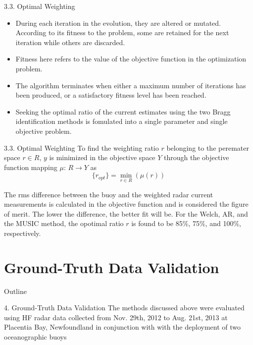 \documentclass[12pt]{beamer}
\begin{document}
\begin{frame}{3.3. Optimal Weighting}
  \begin{itemize}
    \item   During each iteration in the evolution, they are altered or mutated. According to its fitness to the problem, some are retained for the next iteration while others are discarded.
    \item Fitness here refers to the value of the objective function in the optimization problem.
    \item The algorithm terminates when either a maximum number of iterations has been produced, or a satisfactory fitness level has been reached. 
    \item Seeking the optimal ratio of the current estimates using the two Bragg identification methods is fomulated into a single parameter and single objective problem. 
  \end{itemize}
\end{frame}
\begin{frame}{3.3. Optimal Weighting}
   To find the weighting ratio $r$ belonging to the peremater space $r\in R$, $y$ is minimized in the objective space $Y$ through the objective function mapping $\mu$: $R\rightarrow Y$ as
   \begin{equation}
     \{r_{opt}\}=\min_{r\in R}(\mu(r))
   \end{equation}
   
   The rms difference between the buoy and the weighted radar current measurements is calculated in the objective function and is considered the figure of merit. The lower the difference, the better fit will be. For the Welch, AR, and the MUSIC method, the opotimal ratio $r$ is found to be 85\%, 75\%, and 100\%, respectively.
\end{frame}


\section{Ground-Truth Data Validation}
\begin{frame}{Outline}
  \transfade%
  \tableofcontents[sectionstyle=show/shaded,subsectionstyle=show/shaded] %
\end{frame}

\begin{frame}{4. Ground-Truth Data Validation}
    The methods discussed above were evaluated
    using {\color{magenta} HF radar data} collected from Nov. 29th, 2012
    to Aug. 21st, 2013 at Placentia Bay, Newfoundland
    in conjunction with with the deployment of two
    oceanographic buoys
\end{frame}
\end{document}
